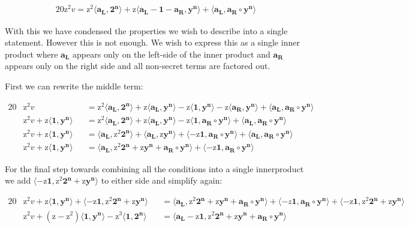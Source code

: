 \documentclass{article}
\newcommand{\eq}[1]{\begin{alignat*}{20}#1\end{alignat*}}
\renewcommand{\vec}[1]{\boldsymbol{#1}}
\newcommand{\ran}[1]{\mathrm{#1}}
\newcommand{\vecran}[1]{\mathbf{#1}}
\newcommand{\dotp}[2]{\langle #1, #2 \rangle}
\begin{document}
\eq{
	\ran{z^2}v = 
	\ran{z^2}\dotp{\vec{a_L}}{\vec{2^n}} +
	\ran{z}\dotp{\vec{a_L} - \vec{1} - \vec{a_R}}{\vecran{y^n}} +
	\dotp{\vec{a_L}}{\vec{a_R}\circ \vecran{y^n}}
}

With this we have condensed the properties we wish to describe into a single statement. However this is not enough. We wish to express this as a single inner product where $\vec{a_L}$ appears only on the left-side of the inner product and $\vec{a_R}$ appears only on the right side and all non-secret terms are factored out. 

First we can rewrite the middle term:

\eq{	
	&\ran{z^2}v &&= 
	\ran{z^2}\dotp{\vec{a_L}}{\vec{2^n}} +
	\ran{z}\dotp{\vec{a_L}}{\vecran{y^n}} -
	\ran{z}\dotp{\vec{1}}{\vecran{y^n}} -
	\ran{z}\dotp{\vec{a_R}}{\vecran{y^n}} +
	\dotp{\vec{a_L}}{\vec{a_R}\circ \vecran{y^n}} \\
	&\ran{z^2}v + \ran{z}\dotp{\vec{1}}{\vecran{y^n}} 
	&&= \ran{z^2}\dotp{\vec{a_L}}{\vec{2^n}} +
	\ran{z}\dotp{\vec{a_L}}{\vecran{y^n}} -
	\ran{z}\dotp{\vec{1}}{\vec{a_R}\circ\vecran{y^n}} +
	\dotp{\vec{a_L}}{\vec{a_R}\circ \vecran{y^n}} \\
	&\ran{z^2}v + \ran{z}\dotp{\vec{1}}{\vecran{y^n}} 
	&&= \dotp{\vec{a_L}}{\ran{z^2}\vec{2^n}} +
	\dotp{\vec{a_L}}{\ran{z}\vecran{y^n}} +
	\dotp{-\ran{z}\vec{1}}{\vec{a_R}\circ\vecran{y^n}} +
	\dotp{\vec{a_L}}{\vec{a_R}\circ \vecran{y^n}} \\
	&\ran{z^2}v + \ran{z}\dotp{\vec{1}}{\vecran{y^n}} 
	&&= \dotp{\vec{a_L}}{\ran{z^2}\vec{2^n} + \ran{z}\vecran{y^n} + \vec{a_R}\circ \vecran{y^n}} +
	\dotp{-\ran{z}\vec{1}}{\vec{a_R}\circ\vecran{y^n}}
}

For the final step towards combining all the conditions into a single innerproduct we add $\dotp{-\ran{z}\vec{1}}{\ran{z^2}\vec{2^n} + \ran{z}\vecran{y^n}}$ to either side and simplify again:

\eq{
	&\ran{z^2}v + \ran{z}\dotp{\vec{1}}{\vecran{y^n}} + \dotp{-\ran{z}\vec{1}}{\ran{z^2}\vec{2^n} + \ran{z}\vecran{y^n}}
	&&= \dotp{\vec{a_L}}{\ran{z^2}\vec{2^n} + \ran{z}\vecran{y^n} + \vec{a_R}\circ \vecran{y^n}} +
	\dotp{-z\vec{1}}{\vec{a_R}\circ\vecran{y^n}} + \dotp{-\ran{z}\vec{1}}{\ran{z^2}\vec{2^n} + \ran{z}\vecran{y^n}} \\
	&\ran{z^2}v + (\ran{z} - \ran{z^2})\dotp{\vec{1}}{\vecran{y^n}} - \ran{z^3}\dotp{\vec{1}}{\vec{2^n}} &&= \dotp{\vec{a_L}- \ran{z}\vec{1}}{\ran{z^2}\vec{2^n} + \ran{z}\vecran{y^n} + \vec{a_R}\circ \vecran{y^n}}
}
\end{document}
